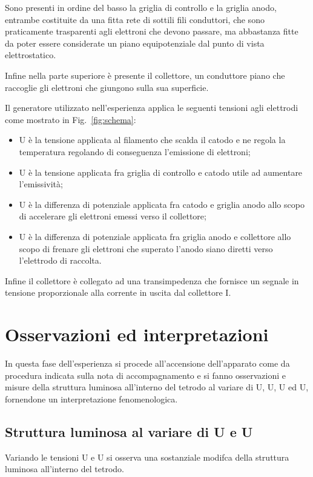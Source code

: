 \documentclass[10pt,a4paper]{article}
\begin{document}
Sono presenti in ordine del basso la griglia di controllo e la griglia anodo, entrambe costituite da una fitta rete di sottili fili conduttori, che sono praticamente trasparenti agli elettroni che devono passare, ma abbastanza fitte da poter essere considerate un piano equipotenziale dal punto di vista elettrostatico.

Infine nella parte superiore è presente il collettore, un conduttore piano che raccoglie gli elettroni che giungono sulla sua superficie.

\newpage
Il generatore utilizzato nell'esperienza applica le seguenti tensioni agli elettrodi come mostrato in Fig.~\ref{fig:schema}:
\begin{itemize}
\item U è la tensione applicata al filamento che scalda il catodo e ne regola la temperatura regolando di conseguenza l'emissione di elettroni;
\item U è la tensione applicata fra griglia di controllo e catodo utile ad aumentare l'emissività;
\item U è la differenza di potenziale applicata fra catodo e griglia anodo allo scopo di accelerare gli elettroni emessi verso il collettore;
\item U è la differenza di potenziale applicata fra griglia anodo e collettore allo scopo di frenare gli elettroni che superato l'anodo siano diretti verso l'elettrodo di raccolta.
\end{itemize}
Infine il collettore è collegato ad una transimpedenza che fornisce un segnale in tensione proporzionale alla corrente in uscita dal collettore I.


\section{Osservazioni ed interpretazioni}
In questa fase dell'esperienza si procede all'accensione dell'apparato come da procedura indicata sulla nota di accompagnamento e si fanno osservazioni e misure della struttura luminosa all'interno del tetrodo al variare di U, U, U ed U, fornendone un interpretazione fenomenologica.

\subsection*{Struttura luminosa al variare di U e U}
Variando le tensioni U e U si osserva una sostanziale modifca della struttura luminosa all'interno del tetrodo. 
\end{document}
